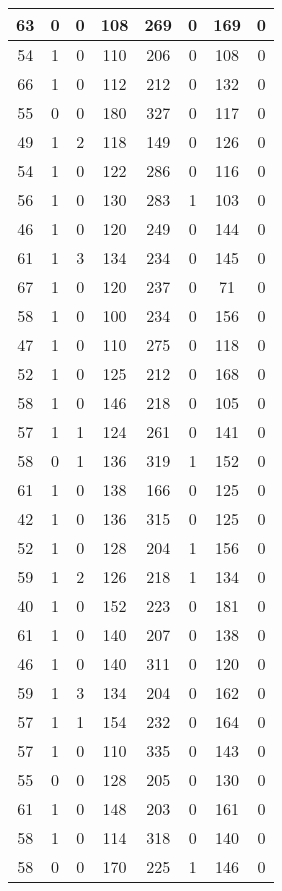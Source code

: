 \documentclass{article}
\begin{document}
\begin{longtable}{|c|c|c|c|c|c|c|c|}
63 & 0 & 0 & 108 & 269 & 0 & 169 & 0 \\ \hline
54 & 1 & 0 & 110 & 206 & 0 & 108 & 0 \\ \hline
66 & 1 & 0 & 112 & 212 & 0 & 132 & 0 \\ \hline
55 & 0 & 0 & 180 & 327 & 0 & 117 & 0 \\ \hline
49 & 1 & 2 & 118 & 149 & 0 & 126 & 0 \\ \hline
54 & 1 & 0 & 122 & 286 & 0 & 116 & 0 \\ \hline
56 & 1 & 0 & 130 & 283 & 1 & 103 & 0 \\ \hline
46 & 1 & 0 & 120 & 249 & 0 & 144 & 0 \\ \hline
61 & 1 & 3 & 134 & 234 & 0 & 145 & 0 \\ \hline
67 & 1 & 0 & 120 & 237 & 0 & 71 & 0 \\ \hline
58 & 1 & 0 & 100 & 234 & 0 & 156 & 0 \\ \hline
47 & 1 & 0 & 110 & 275 & 0 & 118 & 0 \\ \hline
52 & 1 & 0 & 125 & 212 & 0 & 168 & 0 \\ \hline
58 & 1 & 0 & 146 & 218 & 0 & 105 & 0 \\ \hline
57 & 1 & 1 & 124 & 261 & 0 & 141 & 0 \\ \hline
58 & 0 & 1 & 136 & 319 & 1 & 152 & 0 \\ \hline
61 & 1 & 0 & 138 & 166 & 0 & 125 & 0 \\ \hline
42 & 1 & 0 & 136 & 315 & 0 & 125 & 0 \\ \hline
52 & 1 & 0 & 128 & 204 & 1 & 156 & 0 \\ \hline
59 & 1 & 2 & 126 & 218 & 1 & 134 & 0 \\ \hline
40 & 1 & 0 & 152 & 223 & 0 & 181 & 0 \\ \hline
61 & 1 & 0 & 140 & 207 & 0 & 138 & 0 \\ \hline
46 & 1 & 0 & 140 & 311 & 0 & 120 & 0 \\ \hline
59 & 1 & 3 & 134 & 204 & 0 & 162 & 0 \\ \hline
57 & 1 & 1 & 154 & 232 & 0 & 164 & 0 \\ \hline
57 & 1 & 0 & 110 & 335 & 0 & 143 & 0 \\ \hline
55 & 0 & 0 & 128 & 205 & 0 & 130 & 0 \\ \hline
61 & 1 & 0 & 148 & 203 & 0 & 161 & 0 \\ \hline
58 & 1 & 0 & 114 & 318 & 0 & 140 & 0 \\ \hline
58 & 0 & 0 & 170 & 225 & 1 & 146 & 0 \\ \hline

\end{longtable}
\end{document}
